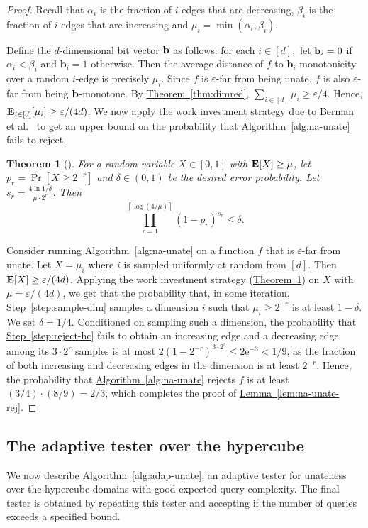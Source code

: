 \documentclass[11pt]{article}
\numberwithin{equation}{section}
\newtheorem{theorem}{Theorem}[section]
\theoremstyle{definition}
\theoremstyle{plain}
\newcommand{\eee}{\mathrm e}
\newcommand{\expref}[2]{\hyperref[#2]{#1~\ref{#2}}}
\newcommand{\eps}{\varepsilon}
\newcommand{\ceil}[1]{\left\lceil {#1} \right\rceil}
\DeclareMathOperator{\E}{\hbox{\bf E}}
\newcommand{\bb}{\ensuremath{\mathbf{b}}}
\newcommand{\Alg}[1]{\expref{Algorithm}{alg:#1}}
\newcommand{\Thm}[1]{\expref{Theorem}{thm:#1}}
\newcommand{\Lem}[1]{\expref{Lemma}{lem:#1}}
\newcommand{\Step}[1]{\expref{Step}{step:#1}}
\begin{document}
\begin{proof} Recall that $\alpha_i$ is the fraction of $i$-edges that are decreasing, $\beta_i$ is the fraction of $i$-edges that are increasing and $\mu_i = \min(\alpha_i,\beta_i)$.
	
	
	Define the $d$-dimensional bit vector ${\bf b}$ as follows: for each $i\in [d],$ let ${\bf b}_i = 0$
	if $\alpha_i < \beta_i$ and $\bb_i = 1$ otherwise.
	Then the average distance of $f$ to $\bb_i$-monotonicity over a random $i$-edge is precisely $\mu_i$.
	Since $f$ is $\eps$-far from being unate,
	$f$ is also $\eps$-far from being ${\bf b}$-monotone.
	By \Thm{dimred}, $\sum_{i \in [d]} \mu_i \geq \eps/4$. Hence, $\E_{i \in [d]}[\mu_i] \geq \eps/{(4d)}$.
	We now apply the work investment strategy due to Berman et al.~\cite{BerRY14} to get an upper bound on the probability that \Alg{na-unate} fails to reject.

\begin{theorem}[\cite{BerRY14}]\label{thm:wis}
For a random variable $X \in [0,1]$ with $\E[X] \geq \mu$, let $p_r = \Pr[X \geq 2^{-r}]$ and $\delta \in (0,1)$ be the desired error probability. Let $s_r = \frac{4 \ln 1/\delta}{\mu \cdot 2^r}$. Then
\[\prod\limits_{r=1}^{\ceil{\log (4/\mu)}} (1-p_r)^{s_r} \leq \delta. \]
\end{theorem}

Consider running \Alg{na-unate} on a function $f$ that is $\eps$-far from unate. Let $X = \mu_i$ where $i$ is sampled uniformly at random from $[d]$. Then $\E[X] \geq \eps/{(4d)}$. Applying the work investment strategy (\Thm{wis}) on $X$ with $\mu= \eps/{(4d)}$, we get that the probability that, in some iteration, \Step{sample-dim} samples a dimension $i$ such that $\mu_i\geq 2^{-r}$ is at least $1-\delta$.
We set $\delta = 1/4$.
Conditioned on sampling such a dimension, the probability that \Step{reject-hc} fails to obtain an increasing edge and a decreasing edge among its $3 \cdot 2^r$ samples is at most $2\left(1-2^{-r}\right)^{3 \cdot 2^r} \leq 2\eee^{-3} < 1/9$, as the fraction of both increasing and decreasing edges in the dimension is at least $2^{-r}$.
Hence, the probability that \Alg{na-unate} rejects $f$ is at least $({3}/{4}) \cdot ({8}/{9}) = {2}/{3}$,
which completes the proof of \Lem{na-unate-rej}.
\end{proof}

\subsection{The adaptive tester over the hypercube}\label{sec:adap-ub}
We now describe \Alg{adap-unate}, an adaptive tester for unateness over the hypercube domains with good expected query complexity. The final tester is obtained by repeating this tester and accepting if the number of queries exceeds a specified bound.
\end{document}
